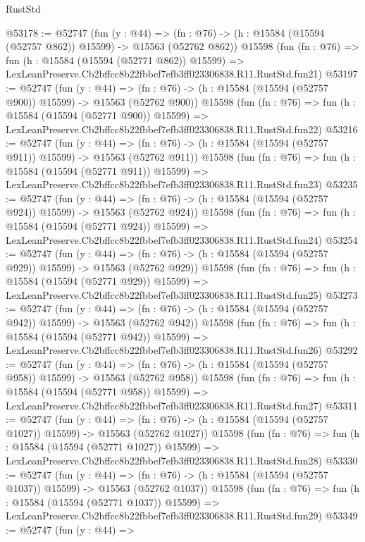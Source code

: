 \begin{lexlean}{RustStd}
\begin{coremodule}
@53178 := @52747
    (fun (y : @44) =>
    (fn : @76) -> (h : @15584 (@15594 (@52757 @862)) @15599) -> @15563 (@52762 @862))
    @15598
    (fun (fn : @76) =>
    fun (h : @15584 (@15594 (@52771 @862)) @15599) =>
    LexLeanPreserve.Cb2bffcc8b22fbbef7efb3ff023306838.R11.RustStd.fun21)
@53197 := @52747
    (fun (y : @44) =>
    (fn : @76) -> (h : @15584 (@15594 (@52757 @900)) @15599) -> @15563 (@52762 @900))
    @15598
    (fun (fn : @76) =>
    fun (h : @15584 (@15594 (@52771 @900)) @15599) =>
    LexLeanPreserve.Cb2bffcc8b22fbbef7efb3ff023306838.R11.RustStd.fun22)
@53216 := @52747
    (fun (y : @44) =>
    (fn : @76) -> (h : @15584 (@15594 (@52757 @911)) @15599) -> @15563 (@52762 @911))
    @15598
    (fun (fn : @76) =>
    fun (h : @15584 (@15594 (@52771 @911)) @15599) =>
    LexLeanPreserve.Cb2bffcc8b22fbbef7efb3ff023306838.R11.RustStd.fun23)
@53235 := @52747
    (fun (y : @44) =>
    (fn : @76) -> (h : @15584 (@15594 (@52757 @924)) @15599) -> @15563 (@52762 @924))
    @15598
    (fun (fn : @76) =>
    fun (h : @15584 (@15594 (@52771 @924)) @15599) =>
    LexLeanPreserve.Cb2bffcc8b22fbbef7efb3ff023306838.R11.RustStd.fun24)
@53254 := @52747
    (fun (y : @44) =>
    (fn : @76) -> (h : @15584 (@15594 (@52757 @929)) @15599) -> @15563 (@52762 @929))
    @15598
    (fun (fn : @76) =>
    fun (h : @15584 (@15594 (@52771 @929)) @15599) =>
    LexLeanPreserve.Cb2bffcc8b22fbbef7efb3ff023306838.R11.RustStd.fun25)
@53273 := @52747
    (fun (y : @44) =>
    (fn : @76) -> (h : @15584 (@15594 (@52757 @942)) @15599) -> @15563 (@52762 @942))
    @15598
    (fun (fn : @76) =>
    fun (h : @15584 (@15594 (@52771 @942)) @15599) =>
    LexLeanPreserve.Cb2bffcc8b22fbbef7efb3ff023306838.R11.RustStd.fun26)
@53292 := @52747
    (fun (y : @44) =>
    (fn : @76) -> (h : @15584 (@15594 (@52757 @958)) @15599) -> @15563 (@52762 @958))
    @15598
    (fun (fn : @76) =>
    fun (h : @15584 (@15594 (@52771 @958)) @15599) =>
    LexLeanPreserve.Cb2bffcc8b22fbbef7efb3ff023306838.R11.RustStd.fun27)
@53311 := @52747
    (fun (y : @44) =>
    (fn : @76) -> (h : @15584 (@15594 (@52757 @1027)) @15599) -> @15563 (@52762 @1027))
    @15598
    (fun (fn : @76) =>
    fun (h : @15584 (@15594 (@52771 @1027)) @15599) =>
    LexLeanPreserve.Cb2bffcc8b22fbbef7efb3ff023306838.R11.RustStd.fun28)
@53330 := @52747
    (fun (y : @44) =>
    (fn : @76) -> (h : @15584 (@15594 (@52757 @1037)) @15599) -> @15563 (@52762 @1037))
    @15598
    (fun (fn : @76) =>
    fun (h : @15584 (@15594 (@52771 @1037)) @15599) =>
    LexLeanPreserve.Cb2bffcc8b22fbbef7efb3ff023306838.R11.RustStd.fun29)
@53349 := @52747
    (fun (y : @44) =>

\end{coremodule}
\end{lexlean}
